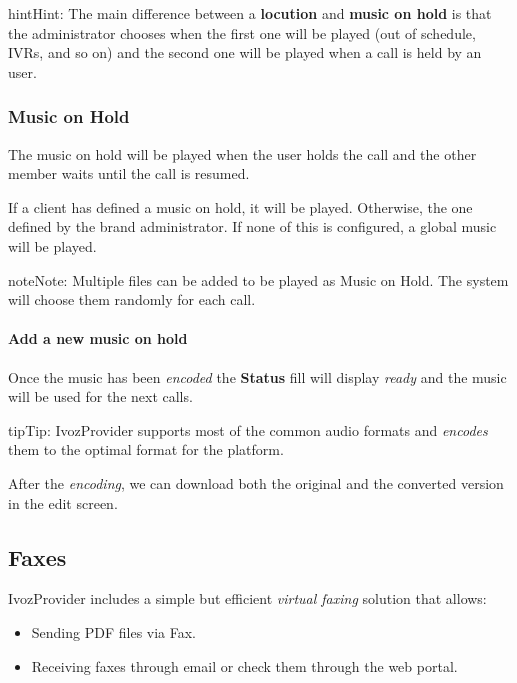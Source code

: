 \documentclass[letterpaper,10pt,english]{sphinxmanual}
\begin{document}
\begin{notice}{hint}{Hint:}
The main difference between a \textbf{locution} and \textbf{music on hold} is
that the administrator chooses when the first one will be played (out of
schedule, IVRs, and so on) and the second one will be played when a call is
held by an user.
\end{notice}


\subsubsection{Music on Hold}
\label{administration_portal/client/vpbx/multimedia/music_on_hold:music-on-hold}\label{administration_portal/client/vpbx/multimedia/music_on_hold::doc}\label{administration_portal/client/vpbx/multimedia/music_on_hold:musiconhold}
The music on hold will be played when the user holds the call and the other
member waits until the call is resumed.

If a client has defined a music on hold, it will be played. Otherwise, the
one defined by the brand administrator. If none of this is configured, a global
music will be played.

\begin{notice}{note}{Note:}
Multiple files can be added to be played as Music on Hold. The system
will choose them randomly for each call.
\end{notice}
\paragraph{Add a new music on hold}

Once the music has been \emph{encoded} the \textbf{Status} fill will display \emph{ready} and
the music will be used for the next calls.

\begin{notice}{tip}{Tip:}
IvozProvider supports most of the common audio formats and \emph{encodes}
them to the optimal format for the platform.
\end{notice}

After the \emph{encoding}, we can download both the original and the converted
version in the edit screen.


\subsection{Faxes}
\label{administration_portal/client/vpbx/faxes:faxes}\label{administration_portal/client/vpbx/faxes::doc}\label{administration_portal/client/vpbx/faxes:faxing-system}
IvozProvider includes a simple but efficient \emph{virtual faxing} solution that allows:
\begin{itemize}
\item {} 
Sending PDF files via Fax.

\item {} 
Receiving faxes through email or check them through the web portal.

\end{itemize}
\end{document}
